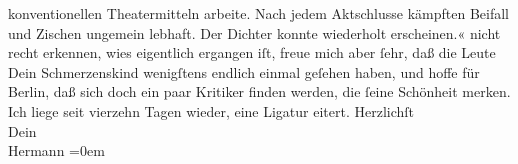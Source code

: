 \begin{ledgroupsized}[t]{13cm}
{{{                     konventionellen Theatermitteln arbeite. Nach jedem Aktschlusse kämpften Beifall
                     und Zischen ungemein lebhaft. Der Dichter konnte wiederholt
                  erscheinen.«}}}\label{K_L01276_1h} nicht recht erkennen, wies eigentlich ergangen iſt,
               freue mich aber ſehr, daß die Leute Dein Schmerzenskind wenigſtens endlich einmal geſehen haben, und
               hoffe für Berlin, daß sich doch ein paar Kritiker
               finden werden, die ſeine Schönheit merken.\pend
           \pstart
           Ich liege seit vierzehn Tagen wieder, eine Ligatur eitert.\pend
           \pstart
           Herzlichſt{\\[\baselineskip]}Dein{\\[\baselineskip]}\spacefill\mbox{Hermann}\pend
           \leftskip=0em{}          \endnumbering{}\end{ledgroupsized}  \newcommand{\dateiname}{L01276}\newcommand{\titel}{Hermann Bahr an Arthur Schnitzler, 15. 3. 1903}\newcommand{\editorInnen}{ Kurt Ifkovits,  Martin Anton Müller}
            \footnotesize
\begin{ledgroupsized}[t]{11.5cm}
\end{ledgroupsized}
         
      